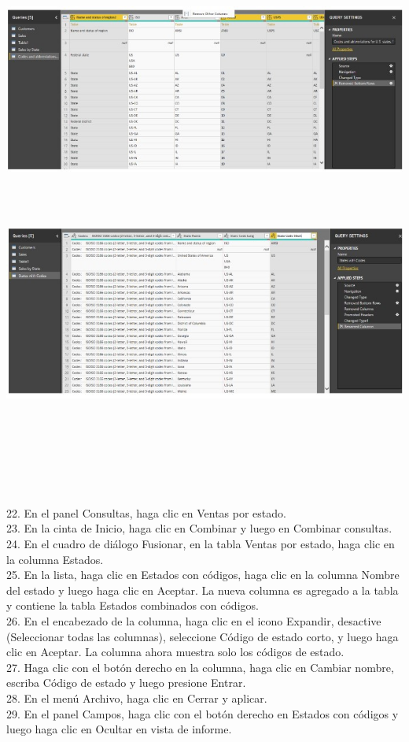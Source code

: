\documentclass[12pt,letterpaper]{article}
\begin{document}
\begin{flushleft}
\begin{itemize}
\textbf{ }\\
\begin{center}
	\includegraphics[width=15cm]{./Imagenes/image31} 
	\end{center}
\textbf{ }\\
\textbf{ }\\
\begin{center}
	\includegraphics[width=15cm]{./Imagenes/image32} 
	\end{center}
\textbf{ }\\
\textbf{ }\\
\textbf{ }\\
\textbf{ }\\
\textbf{ }\\
\textbf{ }\\
22. En el panel Consultas, haga clic en Ventas por estado.\\
23. En la cinta de Inicio, haga clic en Combinar y luego en Combinar consultas.\\
24. En el cuadro de diálogo Fusionar, en la tabla Ventas por estado, haga clic en la columna Estados.\\
25. En la lista, haga clic en Estados con códigos, haga clic en la columna Nombre del estado y luego haga clic en Aceptar. La nueva columna es
agregado a la tabla y contiene la tabla Estados combinados con códigos.\\
26. En el encabezado de la columna, haga clic en el icono Expandir, desactive (Seleccionar todas las columnas), seleccione Código de estado corto,
y luego haga clic en Aceptar. La columna ahora muestra solo los códigos de estado.\\
27. Haga clic con el botón derecho en la columna, haga clic en Cambiar nombre, escriba Código de estado y luego presione Entrar.\\
28. En el menú Archivo, haga clic en Cerrar y aplicar.\\
29. En el panel Campos, haga clic con el botón derecho en Estados con códigos y luego haga clic en Ocultar en vista de informe.\\


\end{itemize}
\end{flushleft}
\end{document}
